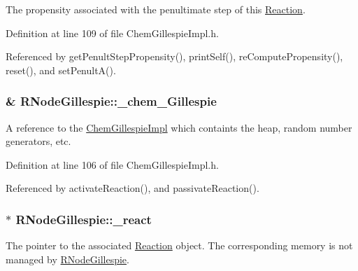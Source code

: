 The propensity associated with the penultimate step of this \hyperlink{classReaction}{Reaction}. 



Definition at line 109 of file Chem\+Gillespie\+Impl.\+h.



Referenced by get\+Penult\+Step\+Propensity(), print\+Self(), re\+Compute\+Propensity(), reset(), and set\+Penult\+A().

\hypertarget{classRNodeGillespie_a17f8b8b148da5586a31a5720e3f2b748}{
\subsubsection[{\+\_\+chem\+\_\+\+Gillespie}]{\& R\+Node\+Gillespie\+::\+\_\+chem\+\_\+\+Gillespie\hspace{0.3cm}{\ttfamily [private]}}}\label{classRNodeGillespie_a17f8b8b148da5586a31a5720e3f2b748}


A reference to the \hyperlink{classChemGillespieImpl}{Chem\+Gillespie\+Impl} which containts the heap, random number generators, etc. 



Definition at line 106 of file Chem\+Gillespie\+Impl.\+h.



Referenced by activate\+Reaction(), and passivate\+Reaction().

\hypertarget{classRNodeGillespie_a17e883bc0b90ba0aef2b5b41e505f066}{
\subsubsection[{\+\_\+react}]{$\ast$ R\+Node\+Gillespie\+::\+\_\+react\hspace{0.3cm}{\ttfamily [private]}}}\label{classRNodeGillespie_a17e883bc0b90ba0aef2b5b41e505f066}


The pointer to the associated \hyperlink{classReaction}{Reaction} object. The corresponding memory is not managed by \hyperlink{classRNodeGillespie}{R\+Node\+Gillespie}. 



